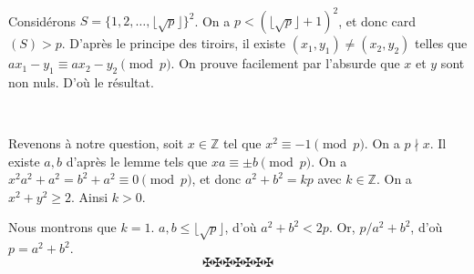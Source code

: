 \


Consid{\'e}rons $S = \{1, 2, \ldots, \lfloor \sqrt{p} \rfloor\}^2$. On a $p <
(\lfloor \sqrt{p} \rfloor + 1)^2$, et donc card$(S) > p$. D'apr{\`e}s le
principe des tiroirs, il existe $(x_1, y_1) \neq (x_2, y_2)$ telles que $ax_1
- y_1 \equiv ax_2 - y_2 \pmod{p}$. On prouve facilement par l'absurde que $x$
et $y$ sont non nuls. D'o{\`u} le r{\'e}sultat.

\


Revenons {\`a} notre question, soit $x \in \mathbb{Z}$ tel que $x^2 \equiv - 1
\pmod{p}$. On a $p \nmid x$. Il existe $a, b$ d'apr{\`e}s le lemme tels que
$xa \equiv \pm b \pmod{p}$. On a $x^2 a^2 + a^2 = b^2 + a^2 \equiv 0
\pmod{p}$, et donc $a^2 + b^2 = kp$ avec $k \in \mathbb{Z}$. On a $x^2 + y^2
\geq 2$. Ainsi $k > 0$.

Nous montrons que $k = 1$. $a, b \leq \lfloor \sqrt{p} \rfloor$, d'o{\`u}
$a^2 + b^2 < 2 p$. Or, $p / a^2 + b^2$, d'o{\`u} $p = a^2 + b^2$.
\[ \maltese \maltese \maltese \maltese \maltese \maltese \maltese \]

